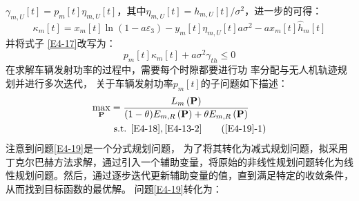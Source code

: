 $\gamma_{m,U}\left[t\right]=p_m\left[t\right]\eta_{m,U}\left[t\right]$，其中$\eta_{m,U}\left[t\right]=h_{m,U}\left[t\right]/{\sigma^2}$，进一步的可得：
\begin{equation} \label{E4-1833}
{{\kappa }_{m}}\left[ t \right]={{x}_{m}}\left[ t \right]\ln \left( 1-a{{\varepsilon }_{3}} \right)-{{y}_{m}}\left[ t \right]{{\eta }_{m,U}}\left[ t \right]a{{\sigma }^{2}}-a{{x}_{m}}\left[ t \right]{{\hat{h}}_{m}}\left[ t \right]
\end{equation}
 并将式子 \eqref{E4-17}改写为：%
\begin{equation} \label{E4-18}
{{p}_{m}}\left[ t \right]{{\kappa }_{m}}\left[ t \right]+a{{\sigma }^{2}}{{\gamma }_{th}}\le 0
\end{equation}
在求解车辆发射功率的过程中，需要每个时隙都要进行功
率分配与无人机轨迹规划并进行多次迭代，
关于车辆发射功率$p_m\left[t\right]$的子问题如下描述：
\begin{align}  \label{E4-19}
\max _{ \mathbf{P}} &   ={\frac{{{L}_{m}}\left( \mathbf{P} \right)}
{(1-\theta){E}_{m,R}\left( \mathbf{P} \right)+\theta{E}_{m,R}\left( \mathbf{P} \right)}}        \\
&\text { s.t. }
 \eqref{E4-18},\eqref{E4-13-2}                                                  \tag{\ref{E4-19}{-1}}      \label{E4-19-1}
\end{align}
注意到问题\eqref{E4-19}是一个分式规划问题，
为了将其转化为减式规划问题，拟采用丁克尔巴赫方法求解，通过引入一个辅助变量，将原始的非线性规划问题转化为线性规划问题。然后，通过逐步迭代更新辅助变量的值，直到满足特定的收敛条件，从而找到目标函数的最优解。
问题\eqref{E4-19}转化为：
